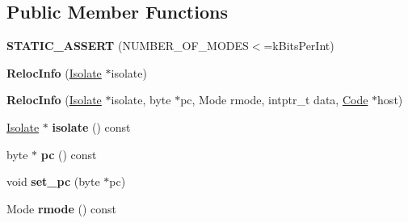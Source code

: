 \subsection*{Public Member Functions}
\begin{DoxyCompactItemize}
\item 
{\bfseries S\+T\+A\+T\+I\+C\+\_\+\+A\+S\+S\+E\+RT} (N\+U\+M\+B\+E\+R\+\_\+\+O\+F\+\_\+\+M\+O\+D\+ES$<$=k\+Bits\+Per\+Int)\hypertarget{classv8_1_1internal_1_1_reloc_info_a0d452667cd0ee0eb944f7ee7cc9b7dea}{}\label{classv8_1_1internal_1_1_reloc_info_a0d452667cd0ee0eb944f7ee7cc9b7dea}

\item 
{\bfseries Reloc\+Info} (\hyperlink{classv8_1_1internal_1_1_isolate}{Isolate} $\ast$isolate)\hypertarget{classv8_1_1internal_1_1_reloc_info_ae7fe0d3d94a93f33aa6b55f9bab652a1}{}\label{classv8_1_1internal_1_1_reloc_info_ae7fe0d3d94a93f33aa6b55f9bab652a1}

\item 
{\bfseries Reloc\+Info} (\hyperlink{classv8_1_1internal_1_1_isolate}{Isolate} $\ast$isolate, byte $\ast$pc, Mode rmode, intptr\+\_\+t data, \hyperlink{classv8_1_1internal_1_1_code}{Code} $\ast$host)\hypertarget{classv8_1_1internal_1_1_reloc_info_a02591d3b7f160b3a603f1fd750a8aa2d}{}\label{classv8_1_1internal_1_1_reloc_info_a02591d3b7f160b3a603f1fd750a8aa2d}

\item 
\hyperlink{classv8_1_1internal_1_1_isolate}{Isolate} $\ast$ {\bfseries isolate} () const \hypertarget{classv8_1_1internal_1_1_reloc_info_a01cae3a877eee7d38b1e3a31a988d075}{}\label{classv8_1_1internal_1_1_reloc_info_a01cae3a877eee7d38b1e3a31a988d075}

\item 
byte $\ast$ {\bfseries pc} () const \hypertarget{classv8_1_1internal_1_1_reloc_info_aa51a0de54cd6ee69318e775b0d696f4e}{}\label{classv8_1_1internal_1_1_reloc_info_aa51a0de54cd6ee69318e775b0d696f4e}

\item 
void {\bfseries set\+\_\+pc} (byte $\ast$pc)\hypertarget{classv8_1_1internal_1_1_reloc_info_ab4d0db4514112f204629a12038067002}{}\label{classv8_1_1internal_1_1_reloc_info_ab4d0db4514112f204629a12038067002}

\item 
Mode {\bfseries rmode} () const \hypertarget{classv8_1_1internal_1_1_reloc_info_a6557113415d565412e8d880495b86439}{}\label{classv8_1_1internal_1_1_reloc_info_a6557113415d565412e8d880495b86439}


\end{DoxyCompactItemize}
